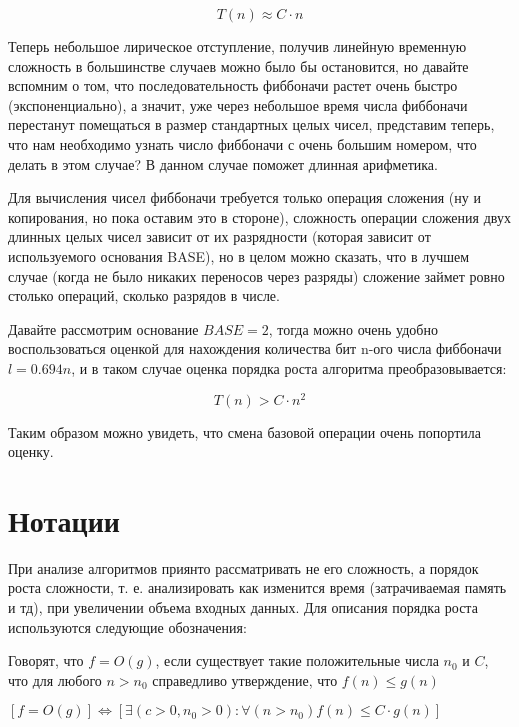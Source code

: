 \begin{equation}
	T \left ( n \right ) \approx C \cdot n
\end{equation}

Теперь небольшое лирическое отступление, получив линейную временную сложность в большинстве случаев можно было бы остановится, но давайте вспомним о том, что последовательность фиббоначи растет очень быстро (экспоненциально), а значит, уже через небольшое время числа фиббоначи перестанут помещаться в размер стандартных целых чисел, представим теперь, что нам необходимо узнать число фиббоначи с очень большим номером, что делать в этом случае? В данном случае поможет длинная арифметика.

Для вычисления чисел фиббоначи требуется только операция сложения (ну и копирования, но пока оставим это в стороне), сложность операции сложения двух длинных целых чисел зависит от их разрядности (которая зависит от используемого основания BASE), но в целом можно сказать, что в лучшем случае (когда не было никаких переносов через разряды) сложение займет ровно столько операций, сколько разрядов в числе.

Давайте рассмотрим основание $ BASE = 2 $, тогда можно очень удобно воспользоваться оценкой для нахождения количества бит n-ого числа фиббоначи $ l = 0.694n $, и в таком случае оценка порядка роста алгоритма преобразовывается:

\begin{equation}
	T \left ( n \right ) > C \cdot n^2
\end{equation}

Таким образом можно увидеть, что смена базовой операции очень попортила оценку.

\section{Нотации}

При анализе алгоритмов приянто рассматривать не его сложность, а порядок роста сложности, т. е. анализировать как изменится время (затрачиваемая память и тд), при увеличении объема входных данных. Для описания порядка роста используются следующие обозначения:

\begin{Def}
	\label{def::o_notation}
	Говорят, что $ f = O ( g ) $, если существует такие положительные числа $ n _0 $ и $ C $, что для любого $ n > n _0 $ справедливо утверждение, что $ f ( n ) \le g ( n ) $ 

	$ \left [ f = O ( g ) \right ] \Leftrightarrow \left [ \exists ( c > 0 , n _0 > 0) : \forall ( n > n _0 ) f ( n ) \le C \cdot g ( n ) \right ] $
\end{Def}

